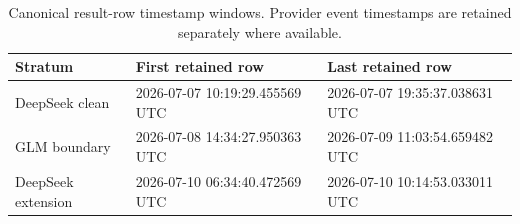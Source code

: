 
\begin{table}[H]
\centering
\caption{Canonical result-row timestamp windows. Provider event timestamps are retained separately where available.}
\label{tab:run-windows}
\small
\begin{tabularx}{\linewidth}{@{}lXX@{}}
\toprule
Stratum & First retained row & Last retained row \\
\midrule
DeepSeek clean & 2026-07-07 10:19:29.455569 UTC & 2026-07-07 19:35:37.038631 UTC \\
GLM boundary & 2026-07-08 14:34:27.950363 UTC & 2026-07-09 11:03:54.659482 UTC \\
DeepSeek extension & 2026-07-10 06:34:40.472569 UTC & 2026-07-10 10:14:53.033011 UTC \\
\bottomrule
\end{tabularx}
\end{table}
